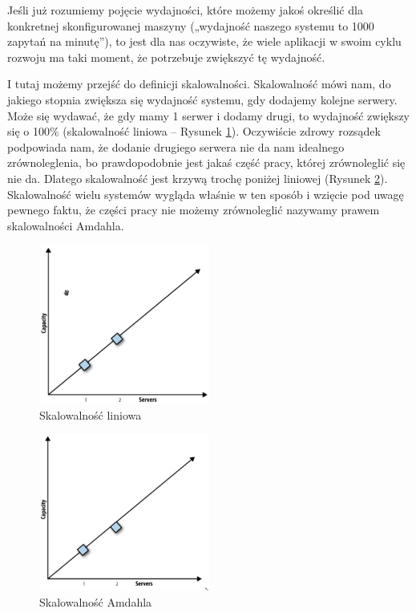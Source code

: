 \documentclass[a4paper,12pt]{article}
\begin{document}
Jeśli już rozumiemy pojęcie wydajności, które możemy jakoś określić dla konkretnej skonfigurowanej maszyny („wydajność naszego systemu to 1000 zapytań na minutę”), to jest dla nas oczywiste, że wiele aplikacji w swoim cyklu rozwoju ma taki moment, że potrzebuje zwiększyć tę wydajność.

I tutaj możemy przejść do definicji skalowalności. Skalowalność mówi nam, do jakiego stopnia zwiększa się wydajność systemu, gdy dodajemy kolejne serwery. Może się wydawać, że gdy mamy 1 serwer i dodamy drugi, to wydajność zwiększy się o 100\% (skalowalność liniowa – Rysunek  \ref{fig:scaling-linear}). Oczywiście zdrowy rozsądek podpowiada nam, że dodanie drugiego serwera nie da nam idealnego zrównoleglenia, bo prawdopodobnie jest jakaś część pracy, której zrównoleglić się nie da. Dlatego skalowalność jest krzywą trochę poniżej liniowej (Rysunek \ref{fig:scaling-almost-linear}). Skalowalność wielu systemów wygląda właśnie w ten sposób i wzięcie pod uwagę pewnego faktu, że części pracy nie możemy zrównoleglić nazywamy prawem skalowalności Amdahla.

\begin{figure}[ht]
\centering
\includegraphics[width=0.5\textwidth]{scaling-linear.png}
\caption{Skalowalność liniowa}
\label{fig:scaling-linear}
\end{figure}

\begin{figure}[ht]
\centering
\includegraphics[width=0.5\textwidth]{scaling-almost-linear.png}
\caption{Skalowalność Amdahla}
\label{fig:scaling-almost-linear}
\end{figure}
\end{document}
